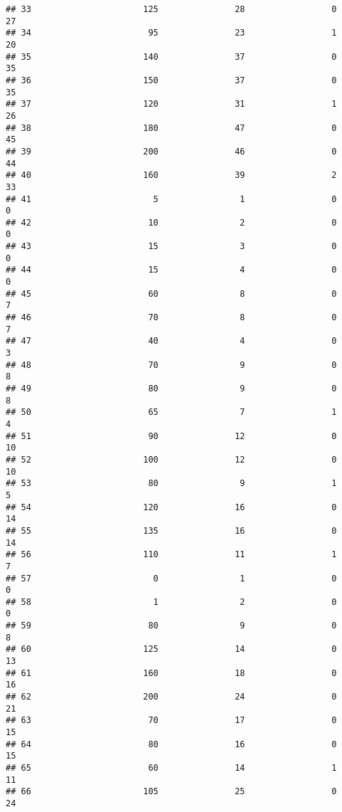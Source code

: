 \documentclass[
]{article}
\begin{document}
\begin{verbatim}
## 33                      125               28                 0         27
## 34                       95               23                 1         20
## 35                      140               37                 0         35
## 36                      150               37                 0         35
## 37                      120               31                 1         26
## 38                      180               47                 0         45
## 39                      200               46                 0         44
## 40                      160               39                 2         33
## 41                        5                1                 0          0
## 42                       10                2                 0          0
## 43                       15                3                 0          0
## 44                       15                4                 0          0
## 45                       60                8                 0          7
## 46                       70                8                 0          7
## 47                       40                4                 0          3
## 48                       70                9                 0          8
## 49                       80                9                 0          8
## 50                       65                7                 1          4
## 51                       90               12                 0         10
## 52                      100               12                 0         10
## 53                       80                9                 1          5
## 54                      120               16                 0         14
## 55                      135               16                 0         14
## 56                      110               11                 1          7
## 57                        0                1                 0          0
## 58                        1                2                 0          0
## 59                       80                9                 0          8
## 60                      125               14                 0         13
## 61                      160               18                 0         16
## 62                      200               24                 0         21
## 63                       70               17                 0         15
## 64                       80               16                 0         15
## 65                       60               14                 1         11
## 66                      105               25                 0         24

\end{verbatim}
\end{document}
